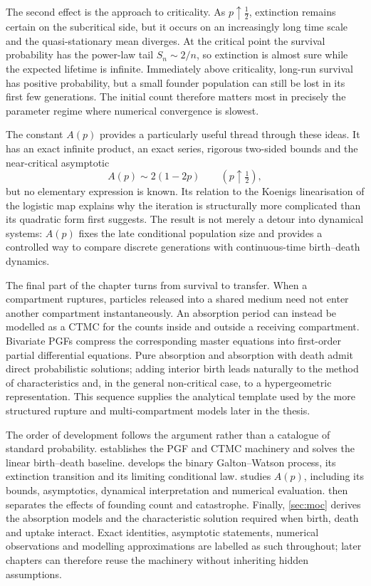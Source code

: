 The second effect is the approach to criticality.  As \(p\uparrow\tfrac12\),
extinction remains certain on the subcritical side, but it occurs on an increasingly
long time scale and the quasi-stationary mean diverges.  At the critical point the
survival probability has the power-law tail \(S_n\sim2/n\), so extinction is almost
sure while the expected lifetime is infinite.  Immediately above criticality,
long-run survival has positive probability, but a small founder population can
still be lost in its first few generations.  The initial count therefore matters
most in precisely the parameter regime where numerical convergence is slowest.

The constant \(A(p)\) provides a particularly useful thread through these ideas.  It
has an exact infinite product, an exact series, rigorous two-sided bounds and the
near-critical asymptotic
\[
  A(p)\sim 2(1-2p)
  \qquad (p\uparrow\tfrac12),
\]
but no elementary expression is known.  Its relation to the Koenigs linearisation
of the logistic map explains why the iteration is structurally more complicated
than its quadratic form first suggests.  The result is not merely a detour into
dynamical systems: \(A(p)\) fixes the late conditional population size and provides
a controlled way to compare discrete generations with continuous-time
birth--death dynamics.

The final part of the chapter turns from survival to transfer.  When a compartment
ruptures, particles released into a shared medium need not enter another
compartment instantaneously.  An absorption period can instead be modelled as a
CTMC for the counts inside and outside a receiving compartment.  Bivariate PGFs
compress the corresponding master equations into first-order partial differential
equations.  Pure absorption and absorption with death admit direct probabilistic
solutions; adding interior birth leads naturally to the method of characteristics
and, in the general non-critical case, to a hypergeometric representation.  This
sequence supplies the analytical template used by the more structured rupture and
multi-compartment models later in the thesis.

The order of development follows the argument rather than a catalogue of standard
probability.   establishes the PGF and CTMC machinery and solves
the linear birth--death baseline.   develops the binary
Galton--Watson process, its extinction transition and its limiting conditional law.
 studies \(A(p)\), including its bounds, asymptotics, dynamical
interpretation and numerical evaluation.   then separates the
effects of founding count and catastrophe.  Finally, \cref{sec:moc} derives the
absorption models and the characteristic solution required when birth, death and
uptake interact.  Exact identities, asymptotic statements, numerical observations
and modelling approximations are labelled as such throughout; later chapters can
therefore reuse the machinery without inheriting hidden assumptions.
